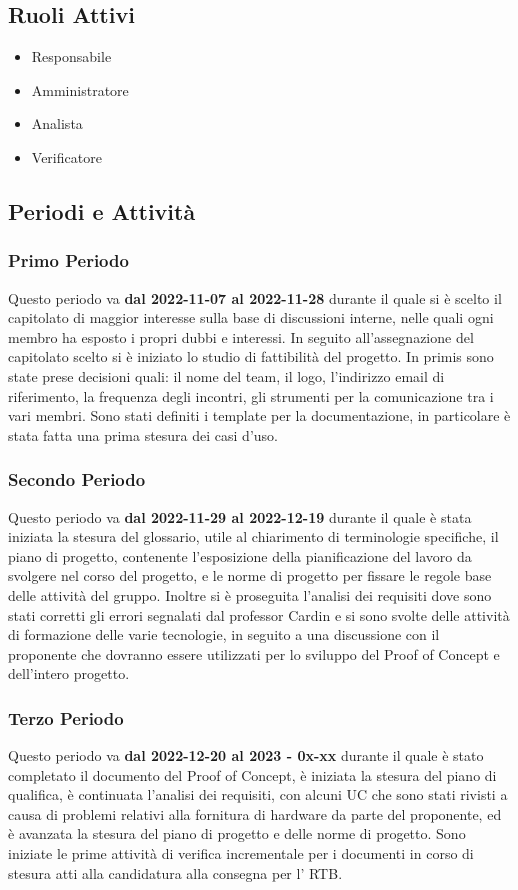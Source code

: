 \subsection{Ruoli Attivi}
\begin{itemize}
    \item Responsabile
    \item Amministratore
    \item Analista
    \item Verificatore
\end{itemize}

\subsection{Periodi e Attività}

\subsubsection{Primo Periodo}
Questo periodo va \textbf{dal 2022-11-07  al  2022-11-28} durante il quale si è scelto il capitolato di maggior interesse sulla base di discussioni interne, nelle quali ogni membro ha esposto i propri dubbi e interessi. In seguito all'assegnazione del capitolato scelto si è iniziato lo studio di fattibilità del progetto. 
In primis sono state prese decisioni quali: il nome del team, il logo, l’indirizzo email di riferimento, la frequenza degli incontri, gli strumenti per la comunicazione tra i vari membri.
Sono stati definiti i template per la documentazione, in particolare è stata fatta una prima stesura dei casi d'uso.

\subsubsection{Secondo Periodo}
Questo periodo va \textbf{dal 2022-11-29  al  2022-12-19} durante il quale è stata iniziata la stesura del glossario, utile al chiarimento di terminologie specifiche, il piano di progetto, contenente l’esposizione della pianificazione del lavoro da svolgere nel corso del progetto, e le norme di progetto per fissare le regole base delle attività del gruppo. 
Inoltre si è proseguita l'analisi dei requisiti dove sono stati corretti gli errori segnalati dal professor Cardin e si sono svolte delle attività di formazione delle varie tecnologie, in seguito a una discussione con il proponente che dovranno essere utilizzati per lo sviluppo del Proof of Concept e dell’intero progetto.

\subsubsection{Terzo Periodo}
Questo periodo va \textbf{dal 2022-12-20  al  2023 - 0x-xx} durante il quale è stato completato il documento del Proof of Concept, è iniziata la stesura del piano di qualifica, è continuata l'analisi dei requisiti, con alcuni UC che sono stati rivisti a causa di problemi relativi alla fornitura di hardware da parte del proponente, ed è avanzata la stesura del piano di progetto e delle norme di progetto.
Sono iniziate le prime attività di verifica incrementale per i documenti in corso di stesura atti alla candidatura alla consegna per l' RTB.

